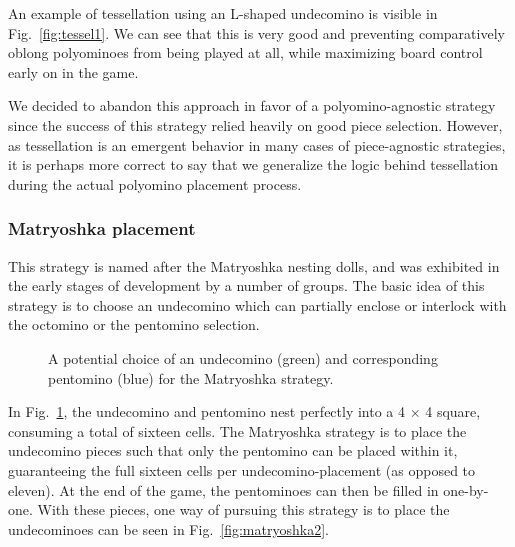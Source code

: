 \documentclass{scrartcl}
\begin{document}
An example of tessellation using an L-shaped undecomino is visible in Fig.~\ref{fig:tessel1}. We can see that this is very good and preventing comparatively oblong polyominoes from being played at all, while maximizing board control early on in the game.

We decided to abandon this approach in favor of a polyomino-agnostic strategy since the success of this strategy relied heavily on good piece selection. However, as tessellation is an emergent behavior in many cases of piece-agnostic strategies, it is perhaps more correct to say that we generalize the logic behind tessellation during the actual polyomino placement process.

\subsubsection{Matryoshka placement}\label{sec:matryoshka}
This strategy is named after the Matryoshka nesting dolls, and was exhibited in the early stages of development by a number of groups. The basic idea of this strategy is to choose an undecomino which can partially enclose or interlock with the octomino or the pentomino selection.

\begin{figure}[h]
\centering
{}
\caption{A potential choice of an undecomino (green) and corresponding pentomino (blue) for the Matryoshka strategy.}\label{fig:matryoshka1}
\end{figure}

In Fig.~\ref{fig:matryoshka1}, the undecomino and pentomino nest perfectly into a 4 $\times$ 4 square, consuming a total of sixteen cells. The Matryoshka strategy is to place the undecomino pieces such that only the pentomino can be placed within it, guaranteeing the full sixteen cells per undecomino-placement (as opposed to eleven). At the end of the game, the pentominoes can then be filled in one-by-one. With these pieces, one way of pursuing this strategy is to place the undecominoes can be seen in Fig.~\ref{fig:matryoshka2}.
\end{document}
